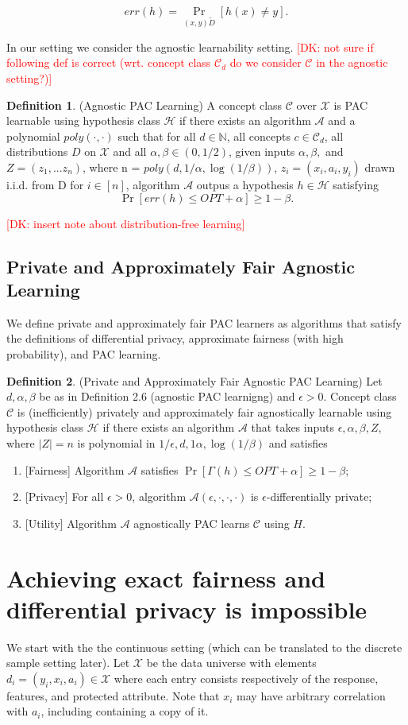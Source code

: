 \documentclass[format = sigconf]{acmart}
\newcommand{\dk}[1]{\textcolor{red}{[DK: #1]}}
\newcommand{\A}{\mathcal{A}}
\renewcommand{\H}{\mathcal{H}}
\renewcommand{\C}{\mathcal{C}}
\newcommand{\X}{\mathcal{X}}
\newcommand{\1}{\mathbbm{1}}
\newcommand{\eps}{\epsilon}
\theoremstyle{definition}
\newtheorem{defn}{Definition}[section]
\begin{document}
$$err(h) = \Pr_{(x,y) \tilde D}[h(x) \neq y].$$

In our setting we consider the agnostic learnability setting.
\dk {not sure if following def is correct (wrt. concept class $\C_d$ do we consider $\C$ in the agnostic setting?)}
\begin{defn}
	(Agnostic PAC Learning) A concept class $\C$ over $\X$ is PAC learnable using hypothesis class $\H$ if there exists an algorithm $\A$ and a polynomial $poly(\cdot,\cdot)$ such that for all $d \in \mathbb{N}$, all concepts $c \in \mathcal{C}_d$, all distributions $D$ on $\X$ and all $\alpha,\beta \in (0,1/2)$, given inputs $\alpha,\beta,$ and $Z = (z_1, ... z_n)$, where n = $poly(d, 1/\alpha, \log(1/\beta))$, $z_i = (x_i, a_i, y_i)$ drawn i.i.d. from D for $i \in [n]$, algorithm $\A$ outpus a hypothesis $h \in \H$ satisfying
	$$\Pr[err(h) \leq OPT + \alpha] \geq 1-\beta.$$

\end{defn}
\dk {insert note about distribution-free learning}
\subsection{Private and Approximately Fair Agnostic Learning}
We define private and approximately fair PAC learners as algorithms that satisfy the definitions of differential privacy, approximate fairness (with high probability), and PAC learning.
\begin{defn}
	(Private and Approximately Fair Agnostic PAC Learning)
	Let $d, \alpha, \beta$ be as in Definition 2.6 (agnostic PAC learnigng) and $\eps > 0$. Concept class $\C$ is (inefficiently) privately and approximately fair agnostically learnable using hypothesis class $\H$ if there exists an algorithm $\A$ that takes inputs $\eps, \alpha, \beta, Z$, where $|Z|=n$ is polynomial in $1/\eps, d, 1\alpha, \log(1/\beta)$ and satisfies
	\begin{enumerate}
		\item {[}Fairness{]} Algorithm $\A$ satisfies $\Pr[\Gamma(h) \leq OPT + \alpha] \geq 1-\beta$;
		\item {[}Privacy{]} For all $\eps>0$, algorithm $\A(\eps, \cdot, \cdot, \cdot)$ is $\eps$-differentially private;
		\item {[}Utility{]} Algorithm $\A$ agnostically PAC learns $\C$ using $H$.
	\end{enumerate}
\end{defn}

\section{Achieving exact fairness and differential privacy is impossible}
We start with the the continuous setting (which can be translated to the discrete sample setting later). Let $\mathcal{X}$ be the data universe with elements $d_i = (y_i,x_i,a_i) \in \mathcal{X}$ where each entry consists respectively of the response, features, and protected attribute. Note that $x_i$ may have arbitrary correlation with $a_i$, including containing a copy of it.
\end{document}
